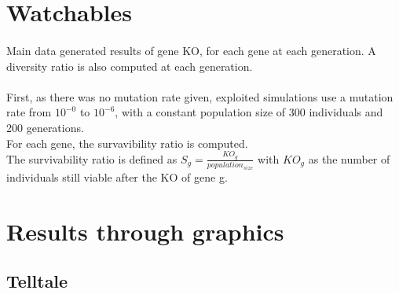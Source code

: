 \documentclass[]{report} %
\begin{document}
\section{Watchables}
    \paragraph*{}
    Main data generated results of gene KO, for each gene at each generation. 
    A diversity ratio is also computed at each generation.
    \paragraph*{}
     First, as there was no mutation rate given, exploited simulations use a mutation rate from $10^{-0}$ to $10^{-6}$, 
     with a constant population size of 300 individuals and 200 generations.\\
     For each gene, the survavibility ratio is computed. \\
     The survivability ratio is defined as $S_{g} = \frac{KO_g}{population_{size}}$ 
     with $KO_g$ as the number of individuals still viable after the KO of gene g.



\newpage
\section*{Results through graphics}
\subsection{Telltale}
\end{document}
